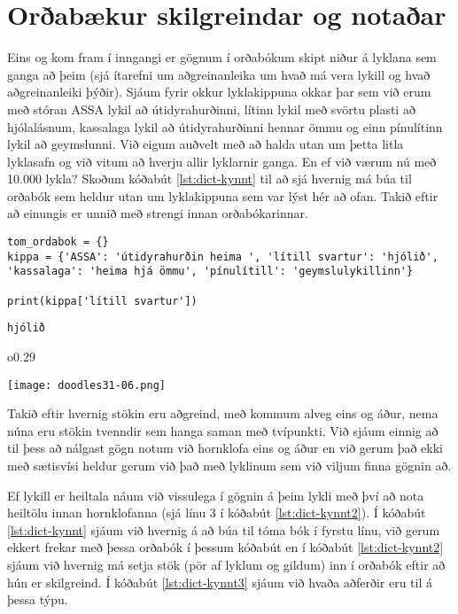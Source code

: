\section{Orðabækur skilgreindar og notaðar}
Eins og kom fram í inngangi er gögnum í orðabókum skipt niður á lyklana sem ganga að þeim (sjá ítarefni um aðgreinanleika um hvað má vera lykill og hvað aðgreinanleiki þýðir).
Sjáum fyrir okkur lyklakippuna okkar þar sem við erum með stóran ASSA lykil að útidyrahurðinni, lítinn lykil með svörtu plasti að hjólalásnum, kassalaga lykil að útidyrahurðinni hennar ömmu og einn pínulítinn lykil að geymslunni.
Við eigum auðvelt með að halda utan um þetta litla lyklasafn og við vitum að hverju allir lyklarnir ganga.
En ef við værum nú með 10.000 lykla?
Skoðum kóðabút \ref{lst:dict-kynnt} til að sjá hvernig má búa til orðabók sem heldur utan um lyklakippuna sem var lýst hér að ofan.
Takið eftir að einungis er unnið með strengi innan orðabókarinnar.

\begin{lstlisting}[caption=Orðabók kynnt með lyklakippusamlíkingu, label=lst:dict-kynnt]
tom_ordabok = {}
kippa = {'ASSA': 'útidyrahurðin heima ', 'lítill svartur': 'hjólið', 'kassalaga': 'heima hjá ömmu', 'pínulítill': 'geymslulykillinn'}

print(kippa['lítill svartur'])
\end{lstlisting}
\lstset{style=uttak}
\begin{lstlisting}
hjólið
\end{lstlisting}
\lstset{style=venjulegt}
 \begin{wrapfigure}{o}{0.29\textwidth} %
	\begin{center}
		\texttt{[image: doodles31-06.png]}
	\end{center}
\end{wrapfigure}
\phantom{}

Takið eftir hvernig stökin eru aðgreind, með kommum alveg eins og áður, nema núna eru stökin tvenndir sem hanga saman með tvípunkti.
Við sjáum einnig að til þess að nálgast gögn notum við hornklofa eins og áður en við gerum það ekki með sætisvísi heldur gerum við það með lyklinum sem við viljum finna gögnin að.

Ef lykill er heiltala náum við vissulega í gögnin á þeim lykli með því að nota heiltölu innan hornklofanna (sjá línu 3 í kóðabút \ref{lst:dict-kynnt2}).
Í kóðabút \ref{lst:dict-kynnt} sjáum við hvernig á að búa til tóma bók í fyrstu línu, við gerum ekkert frekar með þessa orðabók í þessum kóðabút en í kóðabút \ref{lst:dict-kynnt2} sjáum við hvernig má setja stök (pör af lyklum og gildum) inn í orðabók eftir að hún er skilgreind.
Í kóðabút \ref{lst:dict-kynnt3} sjáum við hvaða aðferðir eru til á þessa týpu.

